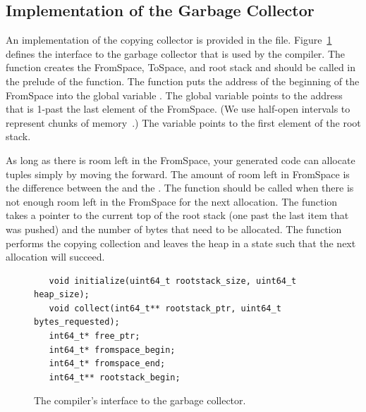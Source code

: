 \documentclass[11pt]{book}
\begin{document}
\subsection{Implementation of the Garbage Collector}
\label{sec:organize-gz}

An implementation of the copying collector is provided in the
 file. Figure~\ref{fig:gc-header} defines the
interface to the garbage collector that is used by the compiler. The
 function creates the FromSpace, ToSpace, and root
stack and should be called in the prelude of the 
function. The  function puts the address of the
beginning of the FromSpace into the global variable
. The global variable  points to
the address that is 1-past the last element of the FromSpace. (We use
half-open intervals to represent chunks of
memory~\citep{Dijkstra:1982aa}.)  The  variable
points to the first element of the root stack.

As long as there is room left in the FromSpace, your generated code
can allocate tuples simply by moving the  forward.
%
The amount of room left in FromSpace is the difference between the
 and the .  The 
function should be called when there is not enough room left in the
FromSpace for the next allocation.  The  function takes
a pointer to the current top of the root stack (one past the last item
that was pushed) and the number of bytes that need to be
allocated. The  function performs the copying collection
and leaves the heap in a state such that the next allocation will
succeed.

\begin{figure}[tbp]
\begin{lstlisting}
   void initialize(uint64_t rootstack_size, uint64_t heap_size);
   void collect(int64_t** rootstack_ptr, uint64_t bytes_requested);
   int64_t* free_ptr;
   int64_t* fromspace_begin;
   int64_t* fromspace_end;
   int64_t** rootstack_begin;
\end{lstlisting}
\caption{The compiler's interface to the garbage collector.}
\label{fig:gc-header}
\end{figure}
\end{document}
